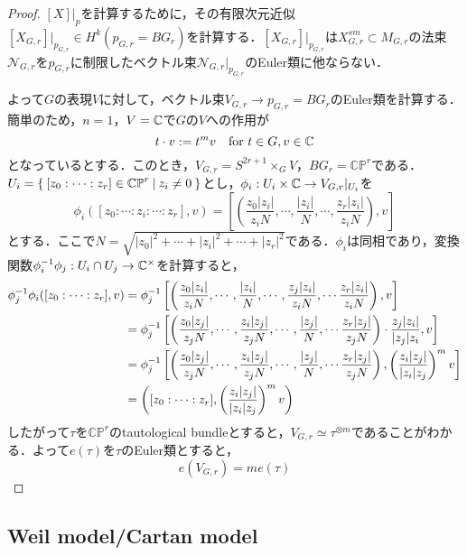 \begin{proof}
  $[X]|_p$を計算するために，その有限次元近似$[X_{G,r}]|_{p_{G,r}}\in H^k(p_{G,r}=BG_r)$を計算する．$[X_{G,r}]|_{p_{G,r}}$は$X^{sm}_{G,r}\subset M_{G,r}$の法束$\mathcal{N}_{G,r}$を$p_{G,r}$に制限したベクトル束$\mathcal{N}_{G,r}|_{p_{G,r}}$のEuler類に他ならない．

  よって$G$の表現$V$に対して，ベクトル束$V_{G,r}\rightarrow p_{G,r}=BG_r$のEuler類を計算する．簡単のため，$n=1$，$V=\mathbb{C}$で$G$の$V$への作用が
  \[
  t\cdot v := t^mv \quad \text{for }t\in G,v\in\mathbb{C}
  \]
  となっているとする．このとき，$V_{G,r} = S^{2r+1}\times_G V$，$BG_r = \mathbb{CP}^r$である．$U_i = \left\{\:[z_0:\cdots:z_r]\in\mathbb{CP}^r\:\middle|\:z_i\neq 0\:\right\}$とし，$\phi_i:U_i\times \mathbb{C}\rightarrow V_{G,r}|_{U_i}$を
  \[
  \phi_i([z_0:\cdots:z_i:\cdots:z_r],v) = \left[\left(\frac{z_0|z_i|}{z_iN},\cdots,\frac{|z_i|}{N},\cdots,\frac{z_r|z_i|}{z_iN}\right), v \right]
  \]
  とする．ここで$N=\sqrt{|z_0|^2+\cdots+|z_i|^2+\cdots+|z_r|^2}$である．$\phi_i$は同相であり，変換関数$\phi_i^{-1}\phi_j:U_i\cap U_j\rightarrow \mathbb{C}^\times$を計算すると，
  \begin{align*}
    \phi_j^{-1}\phi_i([z_0:\cdots:z_r],v)
    &= \phi_j^{-1}\left[\left(\frac{z_0|z_i|}{z_iN},\cdots,\frac{|z_i|}{N},\cdots,\frac{z_j|z_i|}{z_iN},\cdots\frac{z_r|z_i|}{z_iN}\right), v \right]\\
    &=\phi_j^{-1}\left[\left(\frac{z_0|z_j|}{z_jN},\cdots,\frac{z_i|z_j|}{z_jN},\cdots,\frac{|z_j|}{N},\cdots\frac{z_r|z_j|}{z_jN}\right)\cdot \frac{z_j|z_i|}{|z_j|z_i},v\right]\\
    &=\phi_j^{-1}\left[\left(\frac{z_0|z_j|}{z_jN},\cdots,\frac{z_i|z_j|}{z_jN},\cdots,\frac{|z_j|}{N},\cdots\frac{z_r|z_j|}{z_jN}\right) , \left(\frac{z_i|z_j|}{|z_i|z_j}\right)^mv\right]\\
    &=\left([z_0:\cdots:z_r],\left(\frac{z_i|z_j|}{|z_i|z_j}\right)^mv\right)
  \end{align*}
  したがって$\tau$を$\mathbb{CP}^r$のtautological bundleとすると，$V_{G,r}\simeq \tau^{\otimes m}$であることがわかる．よって$e(\tau)$を$\tau$のEuler類とすると，
  \[
  e(V_{G,r}) = m e(\tau)
  \]

  
\end{proof}






\subsection{Weil model/Cartan model}\label{weil/cartan}

